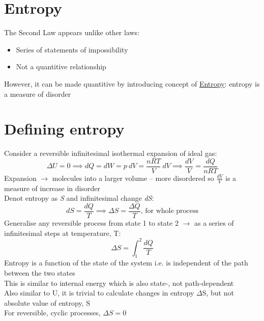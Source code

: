 \documentclass[a4paper, 11pt, normalem]{report}
\begin{document}
\section{Entropy}
The Second Law appears unlike other laws:
\begin{itemize}
	\item Series of statements of impossibility
	\item Not a quantitive relationship
\end{itemize}
However, it can be made quantitive by introducing concept of \underline{Entropy}: entropy is a measure of disorder

\section{Defining entropy}
Consider a reversible infinitesimal isothermal expansion of ideal gas:
\begin{equation*}
	{\Delta}U = 0 \implies dQ = dW = p\:dV = \frac{nRT}{V}\:dV \implies \frac{dV}{V} = \frac{dQ}{nRT}
\end{equation*}
Expansion $\rightarrow$ molecules into a larger volume -- more disordered so $\frac{dV}{V}$ is a measure of increase in disorder \\
Denot entropy as \emph{S} and infinitesimal change \emph{dS}:
\begin{equation*}
	dS = \frac{dQ}{T} \implies {\Delta}S = \frac{{\Delta}Q}{T} \text{, for whole process}
\end{equation*}
Generalise any reversible process from state 1 to state 2 $\rightarrow$ as a series of infinitesimal steps at temperature, T:
\begin{equation*}
	{\Delta}S = \int_{1}^{2} \frac{dQ}{T}
\end{equation*}
Entropy is a function of the state of the system i.e. is independent of the path between the two states \\
This is similar to internal energy which is also state-, not path-dependent \\
Also similar to U, it is trivial to calculate changes in entropy $\Delta$S, but not absolute value of entropy, S \\
For reversible, cyclic processes, ${\Delta}S = 0$
\end{document}
